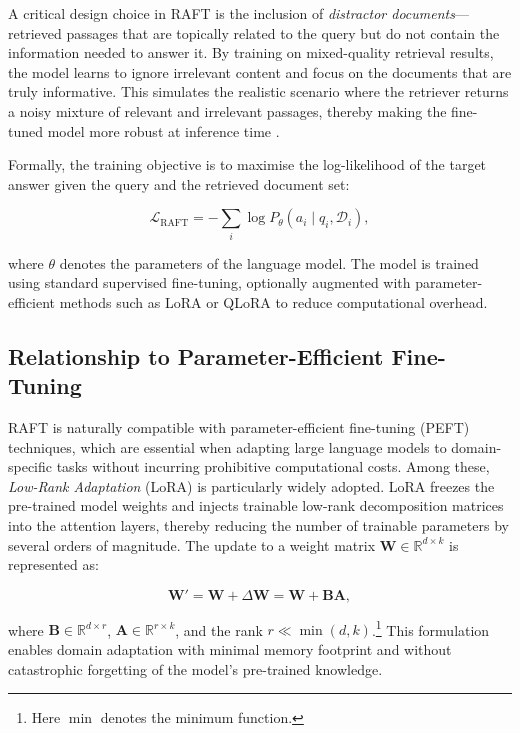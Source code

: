 A critical design choice in RAFT is the inclusion of \emph{distractor documents}---retrieved passages that are topically related to the query but do not contain the information needed to answer it. By training on mixed-quality retrieval results, the model learns to ignore irrelevant content and focus on the documents that are truly informative. This simulates the realistic scenario where the retriever returns a noisy mixture of relevant and irrelevant passages, thereby making the fine-tuned model more robust at inference time \cite{zhang2024raft}.

Formally, the training objective is to maximise the log-likelihood of the target answer given the query and the retrieved document set:

\[
\mathcal{L}_{\mathrm{RAFT}} = -\sum_{i} \log P_{\theta}(a_i \mid q_i, \mathcal{D}_i),
\]

where \(\theta\) denotes the parameters of the language model. The model is trained using standard supervised fine-tuning, optionally augmented with parameter-efficient methods such as LoRA \cite{hu2022lora} or QLoRA \cite{dettmers2023qlora} to reduce computational overhead.

\subsection{Relationship to Parameter-Efficient Fine-Tuning}

RAFT is naturally compatible with parameter-efficient fine-tuning (PEFT) techniques, which are essential when adapting large language models to domain-specific tasks without incurring prohibitive computational costs. Among these, \emph{Low-Rank Adaptation} (LoRA) \cite{hu2022lora} is particularly widely adopted. LoRA freezes the pre-trained model weights and injects trainable low-rank decomposition matrices into the attention layers, thereby reducing the number of trainable parameters by several orders of magnitude. The update to a weight matrix \(\mathbf{W} \in \mathbb{R}^{d \times k}\) is represented as:

\[
\mathbf{W}' = \mathbf{W} + \Delta \mathbf{W} = \mathbf{W} + \mathbf{B}\mathbf{A},
\]

where \(\mathbf{B} \in \mathbb{R}^{d \times r}\), \(\mathbf{A} \in \mathbb{R}^{r \times k}\), and the rank \(r \ll \min(d, k)\).\footnote{Here \(\min\) denotes the minimum function.} This formulation enables domain adaptation with minimal memory footprint and without catastrophic forgetting of the model's pre-trained knowledge.

